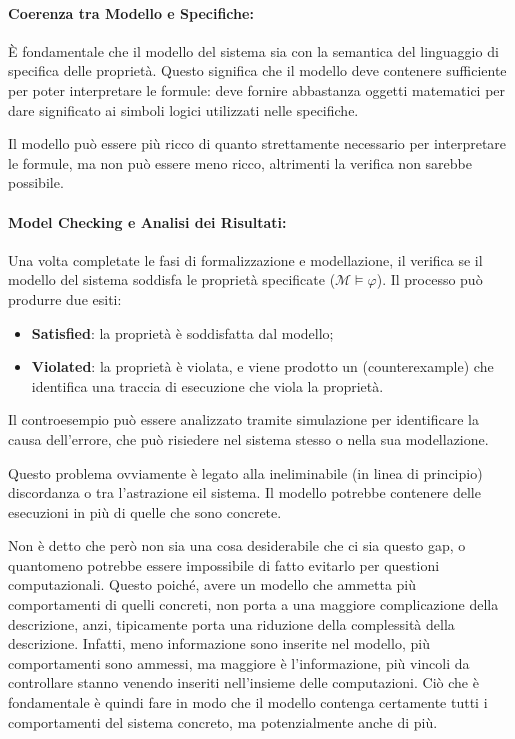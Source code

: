 \paragraph{Coerenza tra Modello e Specifiche:}
È fondamentale che il modello del sistema sia  con la semantica del linguaggio di specifica delle proprietà. Questo significa che il modello deve contenere sufficiente  per poter interpretare le formule: deve fornire abbastanza oggetti matematici per dare significato ai simboli logici utilizzati nelle specifiche.

Il modello può essere più ricco di quanto strettamente necessario per interpretare le formule, ma non può essere meno ricco, altrimenti la verifica non sarebbe possibile.

\paragraph{Model Checking e Analisi dei Risultati:}
Una volta completate le fasi di formalizzazione e modellazione, il  verifica se il modello del sistema soddisfa le proprietà specificate (\(\mathcal{M} \models \varphi\)). Il processo può produrre due esiti:
\begin{itemize}
  \item \textbf{Satisfied}: la proprietà è soddisfatta dal modello;
  \item \textbf{Violated}: la proprietà è violata, e viene prodotto un  (counterexample) che identifica una traccia di esecuzione che viola la proprietà.
\end{itemize}

Il controesempio può essere analizzato tramite simulazione per identificare la causa dell'errore, che può risiedere nel sistema stesso o nella sua modellazione.

Questo problema ovviamente è legato alla ineliminabile (in linea di principio) discordanza o  tra l'astrazione eil sistema.
Il modello potrebbe contenere delle esecuzioni in più di quelle che sono concrete.

Non è detto che però non sia una cosa desiderabile che ci sia questo gap, o quantomeno potrebbe essere impossibile di fatto evitarlo per questioni computazionali.
Questo poiché, avere un modello che ammetta più comportamenti di quelli concreti, non porta a una maggiore complicazione della descrizione, anzi, tipicamente porta una riduzione della complessità della descrizione.
Infatti, meno informazione sono inserite nel modello, più comportamenti sono ammessi, ma maggiore è l'informazione, più vincoli da controllare stanno venendo inseriti nell'insieme delle computazioni.
Ciò che è fondamentale è quindi fare in modo che il modello contenga certamente tutti i comportamenti del sistema concreto, ma potenzialmente anche di più.

